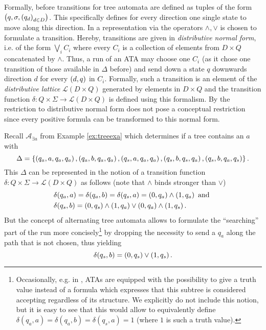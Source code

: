 Formally, before transitions for tree automata are defined as tuples of the 
form $\left(q, \sigma, \left(q_{d}\right)_{d\in D}\right)$. This specifically defines for
every direction one single state to move along this direction. In
\cite{AltTreeAuto} a representation via the operators $\wedge, \vee$ is chosen
to formulate a transition. Hereby, transitions are given in \emph{distributive
normal form}, i.e. of the form $\bigvee_{i} C_{i}$ where every $C_{i}$ is a
collection of elements from $D\times Q$ concatenated by $\wedge$. Thus, a run
of an \ac{ATA} may choose one $C_{i}$ (as it chose one transition of those
available in $\Delta$ before) and send down a state $q$ downwards direction $d$
for every $\left(d,q\right)$ in $C_{i}$. Formally, such a transition is an element
of the \emph{distributive lattice} $\mathcal{L}(D\times Q)$ generated by
elements in $D\times Q$ and the transition function
$\delta:Q\times\Sigma\rightarrow\mathcal{L}(D\times Q)$ is defined using this
formalism. By \cite[Proposition C1]{SimAltTreeAuto} the restriction to
distributive normal form does not pose a conceptual restriction since every
positive formula can be transformed to this normal form.
\begin{example}
  Recall $\mathcal{A}_{\exists a}$ from Example \ref{ex:treeexa} which
  determines if a tree contains an $a$ with 
  \begin{equation*}
    \Delta = \left\{
      \left(q_{a}, a, q_{a}, q_{a}\right),
      \left(q_{a}, b, q_{a}, q_{a}\right),
      \left(q_{s}, a, q_{a}, q_{a}\right),
      \left(q_{s}, b, q_{s}, q_{a}\right),
      \left(q_{s}, b, q_{a}, q_{s}\right)
    \right\}.
  \end{equation*}
  This $\Delta$ can be represented in the notion of a transition function
  $\delta:Q\times\Sigma\rightarrow\mathcal{L}(D\times Q)$ as follows (note that
  $\wedge$ binds stronger than $\vee$)
  \begin{align*}
    &\delta(q_{a}, a) = \delta(q_{a}, b) = \delta(q_{s}, a) =
    \left(0, q_{a}\right)\wedge\left(1, q_{a}\right)
    \text{ and }\\
    &\delta(q_{s}, b) = \left(0, q_{s}\right)\wedge\left(1, q_{a}\right)
    \vee\left(0, q_{a}\right)\wedge\left(1, q_{s}\right).
  \end{align*}
  But the concept of alternating tree automata allows to formulate the
  \enquote{searching} part of the run more concisely\footnote{Occasionally,
  e.g. in \cite[Chapter 9]{AutoLogInfGames}, \acp{ATA} are equipped with the
  possibility to give a truth value instead of a formula which expresses that
  this subtree is considered accepting regardless of its structure. We
  explicitly do not include this notion, but it is easy to see that this would
  allow to equivalently define
  $\delta(q_{a}, a) = \delta(q_{a}, b) = \delta(q_{s}, a) = 1$ (where $1$ is
  such a truth value).} by dropping the necessity to send a $q_{a}$ along the
  path that is not chosen, thus yielding
  \begin{equation*}
    \delta(q_{s}, b) = \left(0, q_{s}\right)\vee\left(1, q_{s}\right).
  \end{equation*}
\end{example}
